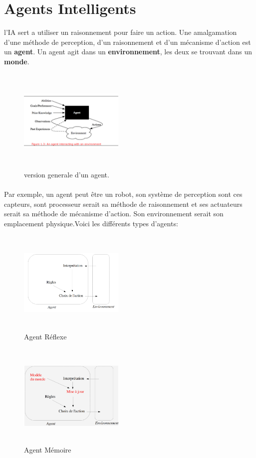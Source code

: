 \documentclass[oneside]{book}
\begin{document}
\section{Agents Intelligents}
l'IA sert a utiliser un raisonnement pour faire un action. Une amalgamation d'une méthode de perception, d'un raisonnement et d'un mécanisme d'action est un \textbf{agent}. Un agent agit dans un \textbf{environnement}, les deux se trouvant dans un \textbf{monde}.
\begin{figure}[!ht]
\centering
\includegraphics[width=5cm, height = 5cm, keepaspectratio]{Agent_base.png}
\caption{version generale d'un agent.}
\label{fig:Agentbase}
\end{figure}
\paragraph{}
Par exemple, un agent peut être un robot, son système de perception sont ces capteurs, sont processeur serait sa méthode de raisonnement et ses actuateurs serait sa méthode de mécanisme d'action. Son environnement serait son emplacement physique.Voici les différents types d'agents:

\begin{figure}[!ht]
\centering
\includegraphics[width=5cm, height=5cm, keepaspectratio]{Agent_Reflexe.png}
\caption{Agent Réflexe}
\label{fig:agentreflexe}
\end{figure}
	

\begin{figure}[!ht]
\centering
\includegraphics[width=5cm, height=5cm, keepaspectratio]{Agent_Memoire.png}
\caption{Agent Mémoire}
\label{fig:agentmem}
\end{figure}
	
\end{document}
